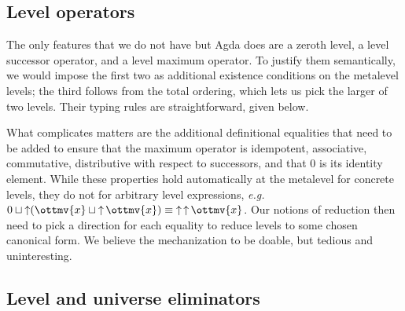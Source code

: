 \documentclass[a4paper,UKenglish,cleveref,autoref,thm-restate]{lipics-v2021}
\makeatletter
\newcommand{\eg}{\textit{e.g.}\@\xspace}
\makeatother
\begin{document}
\subsection{Level operators}

The only features that we do not have but Agda does are a zeroth level,
a level successor operator, and a level maximum operator.
To justify them semantically,
we would impose the first two as additional existence conditions on the metalevel levels;
the third follows from the total ordering, which lets us pick the larger of two levels.
Their typing rules are straightforward, given below.
%

What complicates matters are the additional definitional equalities that need to be added
to ensure that the maximum operator is idempotent, associative, commutative,
distributive with respect to successors,
and that $0$ is its identity element.
While these properties hold automatically at the metalevel for concrete levels,
they do not for arbitrary level expressions,
\eg $   0   \sqcup   \mathop{\uparrow}   (  \ottmv{x}  \sqcup   \mathop{\uparrow}  \ottmv{x}   )     \equiv   \mathop{\uparrow}   \mathop{\uparrow}  \ottmv{x}   $.
Our notions of reduction then need to pick a direction for each equality
to reduce levels to some chosen canonical form.
We believe the mechanization to be doable, but tedious and uninteresting.

\subsection{Level and universe eliminators}
\end{document}
